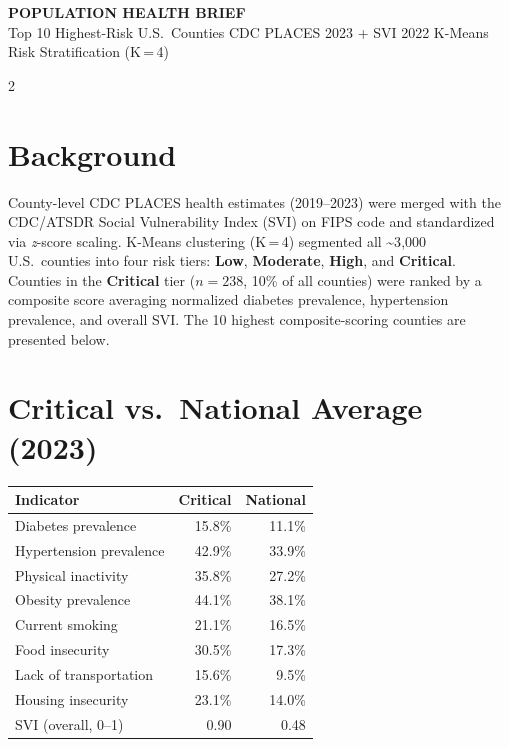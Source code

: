 \documentclass[10pt,letterpaper]{article}
\begin{document}
\colorbox{headbg}{%
  \parbox{\dimexpr\textwidth-2\fboxsep}{%
    \vspace{4pt}
    \centering
    {\large\bfseries\color{white} POPULATION HEALTH BRIEF}\\[2pt]
    {\small\color{white!80!headbg}
      Top 10 Highest-Risk U.S.\ Counties \textbar{}
      CDC PLACES 2023 + SVI 2022 \textbar{}
      K-Means Risk Stratification (K\,=\,4)}
    \vspace{4pt}
  }%
}

\vspace{4pt}

\begin{multicols}{2}

\section{Background}

County-level CDC PLACES health estimates (2019–2023) were merged with the
CDC/ATSDR Social Vulnerability Index (SVI) on FIPS code and standardized via
\textit{z}-score scaling. K-Means clustering (K\,=\,4) segmented all \textasciitilde3{,}000
U.S.\ counties into four risk tiers: \textbf{Low}, \textbf{Moderate}, \textbf{High},
and \textbf{Critical}. Counties in the \textbf{Critical} tier ($n = 238$, 10\% of
all counties) were ranked by a composite score averaging normalized
diabetes prevalence, hypertension prevalence, and overall SVI. The 10 highest
composite-scoring counties are presented below.

\section{Critical vs.\ National Average (2023)}

\begin{tabularx}{\columnwidth}{X r r}
\toprule
\textbf{Indicator} & \textbf{\color{critred}Critical} & \textbf{National} \\
\midrule
Diabetes prevalence       & 15.8\%  & 11.1\% \\
Hypertension prevalence   & 42.9\%  & 33.9\% \\
Physical inactivity       & 35.8\%  & 27.2\% \\
Obesity prevalence        & 44.1\%  & 38.1\% \\
Current smoking           & 21.1\%  & 16.5\% \\
Food insecurity           & 30.5\%  & 17.3\% \\
Lack of transportation    & 15.6\%  &  9.5\% \\
Housing insecurity        & 23.1\%  & 14.0\% \\
SVI (overall, 0--1)       & 0.90    &  0.48  \\
\bottomrule
\end{tabularx}


\end{multicols}
\end{document}
